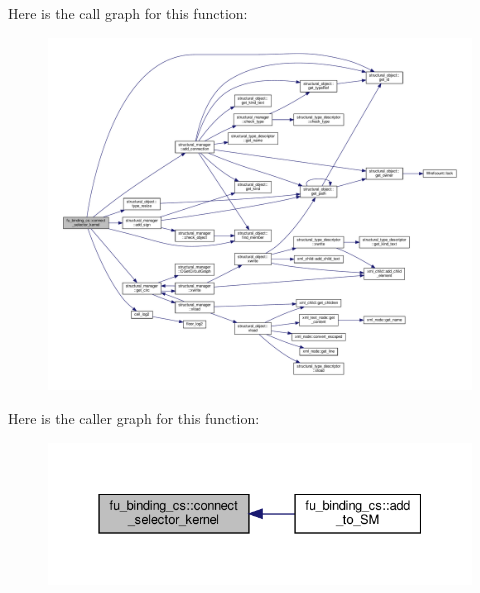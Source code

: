 Here is the call graph for this function\+:
\nopagebreak
\begin{figure}[H]
\begin{center}
\leavevmode
\includegraphics[width=350pt]{d4/d7b/classfu__binding__cs_a5d369fddbe9497c80625c619b78e2c9f_cgraph}
\end{center}
\end{figure}
Here is the caller graph for this function\+:
\nopagebreak
\begin{figure}[H]
\begin{center}
\leavevmode
\includegraphics[width=331pt]{d4/d7b/classfu__binding__cs_a5d369fddbe9497c80625c619b78e2c9f_icgraph}
\end{center}
\end{figure}
\mbox{\label{classfu__binding__cs_afc3cb496a8c77b5f9f79a83967c1c3f3}} 
